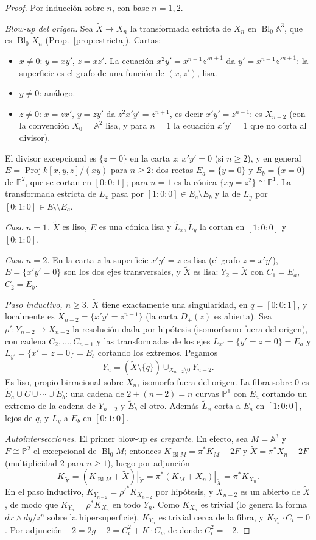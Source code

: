 \documentclass[11pt,a4paper,oneside]{book}
\newcommand{\Proj}{\operatorname{Proj}}
\newcommand{\Bl}{\operatorname{Bl}}
\newcommand{\A}{\mathbb{A}}
\newcommand{\PP}{\mathbb{P}}
\theoremstyle{plain}
\theoremstyle{definition}
\theoremstyle{remark}
\begin{document}
\begin{proof}
Por inducción sobre $n$, con base $n=1,2$.

\emph{Blow-up del origen.} Sea $\tilde X\to X_n$ la transformada estricta de $X_n$ en $\Bl_0\A^3$, que es $\Bl_0X_n$ (Prop.~\ref{prop:estricta}). Cartas:
\begin{itemize}
\item $x\ne0$: $y=xy'$, $z=xz'$. La ecuación $x^2y'=x^{n+1}z'^{n+1}$ da $y'=x^{n-1}z'^{n+1}$: la superficie es el grafo de una función de $(x,z')$, lisa.
\item $y\ne0$: análogo.
\item $z\ne0$: $x=zx'$, $y=zy'$ da $z^2x'y'=z^{n+1}$, es decir $x'y'=z^{n-1}$: es $X_{n-2}$ (con la convención $X_0=\A^2$ lisa, y para $n=1$ la ecuación $x'y'=1$ que no corta al divisor).
\end{itemize}
El divisor excepcional es $\{z=0\}$ en la carta $z$: $x'y'=0$ (si $n\ge2$), y en general $E=\Proj k[x,y,z]/(xy)$ para $n\ge2$: dos rectas $E_a=\{y=0\}$ y $E_b=\{x=0\}$ de $\PP^2$, que se cortan en $[0:0:1]$; para $n=1$ es la cónica $\{xy=z^2\}\cong\PP^1$. La transformada estricta de $L_x$ pasa por $[1:0:0]\in E_a\setminus E_b$ y la de $L_y$ por $[0:1:0]\in E_b\setminus E_a$.

\emph{Caso $n=1$.} $\tilde X$ es liso, $E$ es una cónica lisa y $\tilde L_x,\tilde L_y$ la cortan en $[1:0:0]$ y $[0:1:0]$.

\emph{Caso $n=2$.} En la carta $z$ la superficie $x'y'=z$ es lisa (el grafo $z=x'y'$), $E=\{x'y'=0\}$ son los dos ejes transversales, y $\tilde X$ es lisa: $Y_2=\tilde X$ con $C_1=E_a$, $C_2=E_b$.

\emph{Paso inductivo, $n\ge3$.} $\tilde X$ tiene exactamente una singularidad, en $q=[0:0:1]$, y localmente es $X_{n-2}=\{x'y'=z^{n-1}\}$ (la carta $D_+(z)$ es abierta). Sea $\rho':Y_{n-2}\to X_{n-2}$ la resolución dada por hipótesis (isomorfismo fuera del origen), con cadena $C_2,\dots,C_{n-1}$ y las transformadas de los ejes $L_{x'}=\{y'=z=0\}=E_a$ y $L_{y'}=\{x'=z=0\}=E_b$ cortando los extremos. Pegamos
\[
Y_n=(\tilde X\setminus\{q\})\cup_{X_{n-2}\setminus 0}Y_{n-2}.
\]
Es liso, propio birracional sobre $X_n$, isomorfo fuera del origen. La fibra sobre $0$ es $\tilde E_a\cup C\cup\cdots\cup\tilde E_b$: una cadena de $2+(n-2)=n$ curvas $\PP^1$ con $\tilde E_a$ cortando un extremo de la cadena de $Y_{n-2}$ y $\tilde E_b$ el otro. Además $\tilde L_x$ corta a $E_a$ en $[1:0:0]$, lejos de $q$, y $\tilde L_y$ a $E_b$ en $[0:1:0]$.

\emph{Autointersecciones.} El primer blow-up es \emph{crepante}. En efecto, sea $M=\A^3$ y $F\cong\PP^2$ el excepcional de $\Bl_0M$; entonces $K_{\Bl M}=\pi^*K_M+2F$ y $\tilde X=\pi^*X_n-2F$ (multiplicidad $2$ para $n\ge1$), luego por adjunción
\[
K_{\tilde X}=(K_{\Bl M}+\tilde X)|_{\tilde X}=\pi^*(K_M+X_n)|_{\tilde X}=\pi^*K_{X_n}.
\]
En el paso inductivo, $K_{Y_{n-2}}=\rho'^*K_{X_{n-2}}$ por hipótesis, y $X_{n-2}$ es un abierto de $\tilde X$, de modo que $K_{Y_n}=\rho^*K_{X_n}$ en todo $Y_n$. Como $K_{X_n}$ es trivial (lo genera la forma $dx\wedge dy/z^n$ sobre la hipersuperficie), $K_{Y_n}$ es trivial cerca de la fibra, y $K_{Y_n}\cdot C_i=0$. Por adjunción $-2=2g-2=C_i^2+K\cdot C_i$, de donde $C_i^2=-2$.
\end{proof}
\end{document}
